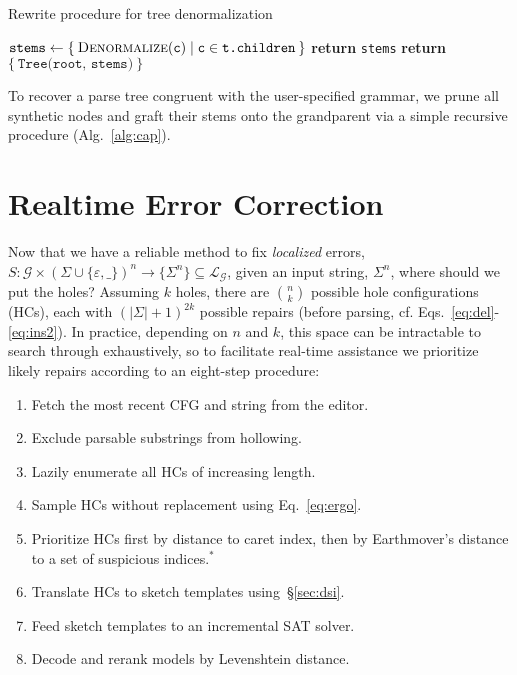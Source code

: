 \documentclass[sigplan,review,anonymous,acmsmall]{acmart}\settopmatter{printfolios=false,printccs=false,printacmref=false}
\begin{document}
    \begin{algorithm}
        \caption{Rewrite procedure for tree denormalization}\label{alg:cap}
        \begin{algorithmic}
                \State $\texttt{stems} \leftarrow \{\:\textsc{Denormalize}(\texttt{c}) \mid \texttt{c} \in \texttt{t.children}\:\}$
                    \State \textbf{return } \texttt{stems} 
                \Else{}
                \State \textbf{return } $\{\:\texttt{Tree(root, stems)}\:\}$
                \EndIf
            \EndProcedure
        \end{algorithmic}
    \end{algorithm}

    \noindent To recover a parse tree congruent with the user-specified grammar, we prune all synthetic nodes and graft their stems onto the grandparent via a simple recursive procedure (Alg.~\ref{alg:cap}).%

    

    \section{Realtime Error Correction}\label{sec:holes}

    Now that we have a reliable method to fix \textit{localized} errors, $S: \mathcal{G} \times (\Sigma\cup\{\varepsilon, \texttt{\_}\})^n \rightarrow \{\Sigma^n\}\subseteq \mathcal{L}_\mathcal{G}$, given an input string, $\Sigma^n$, where should we put the holes? Assuming $k$ holes, there are ${n \choose k}$ possible hole configurations (HCs), each with $(|\Sigma| + 1)^{2k}$ possible repairs (before parsing, cf. Eqs.~\ref{eq:del}-\ref{eq:ins2}). In practice, depending on $n$ and $k$, this space can be intractable to search through exhaustively, so to facilitate real-time assistance we prioritize likely repairs according to an eight-step procedure:

    \begin{enumerate}
        \item Fetch the most recent CFG and string from the editor.
        \item Exclude parsable substrings from hollowing.
        \item Lazily enumerate all HCs of increasing length.
        \item Sample HCs without replacement using Eq.~\ref{eq:ergo}.
        \item Prioritize HCs first by distance to caret index, then by Earthmover's distance to a set of suspicious indices.$^*$
        \item Translate HCs to sketch templates using~\S\ref{sec:dsi}.
        \item Feed sketch templates to an incremental SAT solver.
        \item Decode and rerank models by Levenshtein distance.
    \end{enumerate}
\end{document}
